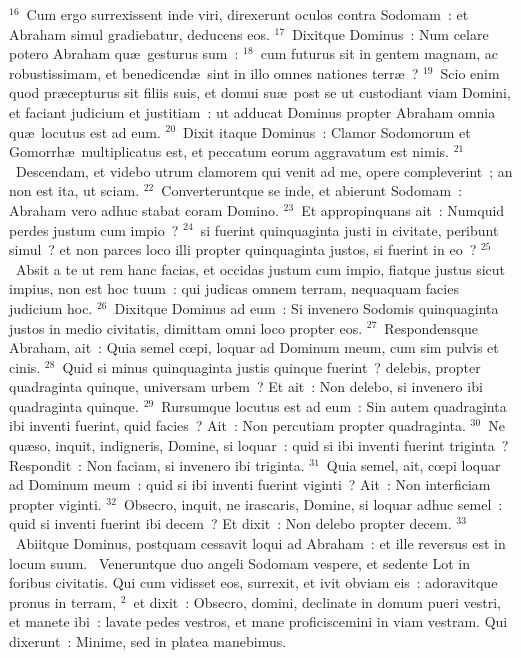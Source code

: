 ${}^{16}$~Cum ergo surrexissent inde viri, direxerunt oculos contra Sodomam~: et Abraham simul gradiebatur, deducens eos.
${}^{17}$~Dixitque Dominus~: Num celare potero Abraham qu\ae\ gesturus sum~:
${}^{18}$~cum futurus sit in gentem magnam, ac robustissimam, et benedicend\ae\ sint in illo omnes nationes terr\ae~?
${}^{19}$~Scio enim quod pr\ae cepturus sit filiis suis, et domui su\ae\ post se ut custodiant viam Domini, et faciant judicium et justitiam~: ut adducat Dominus propter Abraham omnia qu\ae\ locutus est ad eum.
${}^{20}$~Dixit itaque Dominus~: Clamor Sodomorum et Gomorrh\ae\ multiplicatus est, et peccatum eorum aggravatum est nimis.
${}^{21}$~Descendam, et videbo utrum clamorem qui venit ad me, opere compleverint~; an non est ita, ut sciam.
${}^{22}$~Converteruntque se inde, et abierunt Sodomam~: Abraham vero adhuc stabat coram Domino.
${}^{23}$~Et appropinquans ait~: Numquid perdes justum cum impio~?
${}^{24}$~si fuerint quinquaginta justi in civitate, peribunt simul~? et non parces loco illi propter quinquaginta justos, si fuerint in eo~?
${}^{25}$~Absit a te ut rem hanc facias, et occidas justum cum impio, fiatque justus sicut impius, non est hoc tuum~: qui judicas omnem terram, nequaquam facies judicium hoc.
${}^{26}$~Dixitque Dominus ad eum~: Si invenero Sodomis quinquaginta justos in medio civitatis, dimittam omni loco propter eos.
${}^{27}$~Respondensque Abraham, ait~: Quia semel cœpi, loquar ad Dominum meum, cum sim pulvis et cinis.
${}^{28}$~Quid si minus quinquaginta justis quinque fuerint~? delebis, propter quadraginta quinque, universam urbem~? Et ait~: Non delebo, si invenero ibi quadraginta quinque.
${}^{29}$~Rursumque locutus est ad eum~: Sin autem quadraginta ibi inventi fuerint, quid facies~? Ait~: Non percutiam propter quadraginta.
${}^{30}$~Ne qu\ae so, inquit, indigneris, Domine, si loquar~: quid si ibi inventi fuerint triginta~? Respondit~: Non faciam, si invenero ibi triginta.
${}^{31}$~Quia semel, ait, cœpi loquar ad Dominum meum~: quid si ibi inventi fuerint viginti~? Ait~: Non interficiam propter viginti.
${}^{32}$~Obsecro, inquit, ne irascaris, Domine, si loquar adhuc semel~: quid si inventi fuerint ibi decem~? Et dixit~: Non delebo propter decem.
${}^{33}$~Abiitque Dominus, postquam cessavit loqui ad Abraham~: et ille reversus est in locum suum.
~Veneruntque duo angeli Sodomam vespere, et sedente Lot in foribus civitatis. Qui cum vidisset eos, surrexit, et ivit obviam eis~: adoravitque pronus in terram,
${}^{2}$~et dixit~: Obsecro, domini, declinate in domum pueri vestri, et manete ibi~: lavate pedes vestros, et mane proficiscemini in viam vestram. Qui dixerunt~: Minime, sed in platea manebimus.
